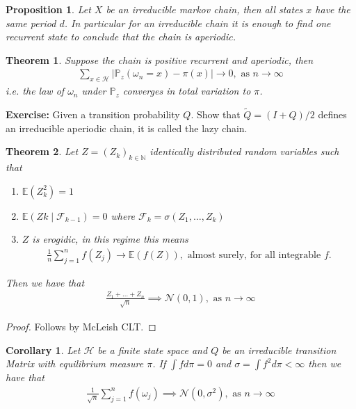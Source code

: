 \documentclass[11pt,a4paper, final]{article}
\newtheorem{thm}{Theorem}[section]
\newtheorem{prop}{Proposition}[section]
\newtheorem{cor}{Corollary}[section]
\theoremstyle{definition}
\begin{document}
\begin{prop} Let $X$ be an irreducible markov chain, then all states $x$ have the same period $d$. In particular for an irreducible chain it is enough to find one recurrent state to conclude that the chain is aperiodic. 
\end{prop}
\begin{thm} Suppose the chain is positive recurrent and aperiodic, then 
\begin{align*}
\sum_{x \in \mathcal{H}} | \mathbb{P}_z( \omega_n =x) - \pi (x) | \to 0, \text{ as } n \to \infty 
\end{align*}
i.e. the law of $\omega_n$ under $\mathbb{P}_z$ converges in total variation to $\pi$. 
\end{thm}
\textbf{Exercise:} Given a transition probability $Q$. Show that $\tilde{Q} = (I + Q)/2$ defines an irreducible aperiodic chain, it is called the lazy chain. 
\newpage
\begin{thm} Let $Z=(Z_k)_{k \in \mathbb{N}}$ identically distributed random variables such that
\begin{enumerate}
\item $\mathbb{E}(Z_k^2)=1$ 
\item $\mathbb{E}(Zk \mid \mathcal{F}_{k-1}) = 0$ where $\mathcal{F}_k = \sigma (Z_1, \dots , Z_k)$
\item $Z$ is erogidic, in this regime this means 
\begin{align*}
\frac{1}{n} \sum_{j=1}^n f(Z_j) \to \mathbb{E}(f(Z)), \text{ almost surely, for all integrable $f$}.
\end{align*}
\end{enumerate}
Then we have that
\begin{align*}
\frac{Z_1 + \dots + Z_n}{\sqrt{n}} \implies \mathcal{N}(0,1), \text{ as } n  \to \infty 
\end{align*}
\end{thm}
\begin{proof}
Follows by McLeish CLT.
\end{proof}
\begin{cor} Let $\mathcal{H}$ be a finite state space and $Q$ be an irreducible transition Matrix with equilibrium measure $\pi$. If $\int f d  \pi =0$ and $\sigma = \int f^2 d \pi <  \infty$ then we have that 
\begin{align*}
\frac{1}{\sqrt{n}} \sum_{j=1}^n f ( \omega_j) \implies \mathcal{N}(0, \sigma^2), \text{ as } n  \to \infty 
\end{align*}
\end{cor}
\newpage
\end{document}
